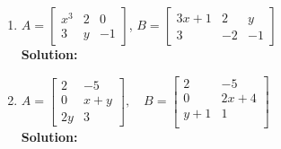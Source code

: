 \begin{enumerate}
\begin{banswer}
        Substitute $x=\frac{y}{2}$ into the second equation:
        $$
        \begin{aligned}
            y &= \frac{y}{2}+1,\\
            2y &= y+2,\\
            y &= 2,\qquad x=\frac{y}{2}=1.
        \end{aligned}
        $$

        \begin{tcolorbox}
            \centering
            $x=1,\qquad y=2$
        \end{tcolorbox}
    \end{banswer} 

    \item 
    $A = \begin{bmatrix}
        x^3 & 2 & 0 \\
        3 & y & -1
    \end{bmatrix}$, \quad
    $B = \begin{bmatrix}
        3x + 1 & 2 & y \\
        3 & -2 & -1
    \end{bmatrix}$ \\[0.5em]

    \textbf{Solution:}
    \begin{banswer}
    \end{banswer}

    \item 
    $A = \begin{bmatrix}
        2 & -5 \\
        0 & x + y \\
        2y & 3
    \end{bmatrix}, \quad
    B = \begin{bmatrix}
        2 & -5 \\    
        0 & 2x + 4 \\    
        y + 1 & 1 \\    
    \end{bmatrix}$  \\[0.5em]

    \textbf{Solution:}

    \end{enumerate}

